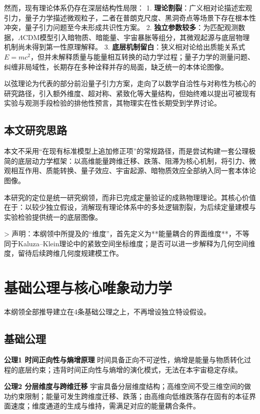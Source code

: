 \documentclass[12pt,a4paper]{ctexart}
\begin{document}
然而，现有理论体系仍存在深层结构性局限：
1. \textbf{理论割裂}：广义相对论描述宏观引力，量子力学描述微观粒子，二者在普朗克尺度、黑洞奇点等场景下存在根本性冲突，量子引力问题至今未形成共识性方案\cite{weinberg1972, rovelli2004}。
2. \textbf{独立参数较多}：为匹配观测数据，$\Lambda$CDM模型引入暗物质、暗能量、宇宙暴胀等组分，其微观起源与底层物理机制尚未得到第一性原理解释\cite{peebles1993}。
3. \textbf{底层机制留白}：狭义相对论给出质能关系式$E=mc^2$，但并未解释质量与能量相互转换的动力学过程；量子力学的测量问题、纠缠非局域性，长期存在多种诠释并存的局面，缺乏统一的本体论图像\cite{bell1964, zeilinger2010}。

以弦理论为代表的部分前沿量子引力方案，走向了以数学自洽性与对称性为核心的研究路径，引入额外维度、超对称、紧致化等大量结构，但始终难以提出可被现有实验与观测手段检验的排他性预言，其物理实在性长期受到学界讨论\cite{smolin2006, witten1996}。

\subsection{本文研究思路}
本文不采用“在现有标准模型上追加修正项”的常规路径，而是尝试构建一套公理极简的底层动力学框架：以高维能量跨维迁移、跌落、阻滞为核心机制，将引力、微观相互作用、质能转换、量子效应、宇宙起源、暗物质效应全部纳入同一套本体论图像。

本研究的定位是统一研究纲领，而非已完成定量验证的成熟物理理论。其核心价值在于：以较少独立假设，消解现有理论体系中的多处逻辑割裂，为后续定量建模与实验检验提供统一的底层图像。

> 声明：本纲领中所提及的“维度”，首先定义为**能量耦合的界面维度**，不等同于Kaluza–Klein理论中的紧致空间坐标维度；是否可以进一步解释为几何空间维度，留待后续跨维几何度规建模工作。

\section{基础公理与核心唯象动力学}
本纲领全部推导建立在4条基础公理之上，不再增设独立特设假设。

\subsection{基础公理}
\textbf{公理1 时间正向性与熵增原理}
时间具备正向不可逆性，熵增是能量与物质转化过程的底层约束；违背时间正向性与熵增的演化模式，无法在本宇宙稳定存续\cite{landau1980}。

\textbf{公理2 分层维度与跨维迁移}
宇宙具备分层维度结构；高维空间不受三维空间的做功约束限制；能量可发生跨维度迁移、跌落；由高维向低维跌落存在固有的本征界面速度；维度通道的生成与维持，需满足对应的能量耦合条件。
\end{document}
